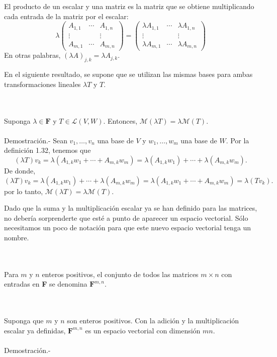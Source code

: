 \begin{mydef}\;\\\\
    El producto de un escalar y una matriz es la matriz que se obtiene multiplicando cada entrada de la matriz por el escalar:
    $$
    \lambda
	\begin{pmatrix}
	    A_{1,1}&\cdots&A_{1,n}\\
	    \vdots&&\vdots\\
	    A_{m,1}&\cdots&A_{m,n}
	\end{pmatrix}
	=
	\begin{pmatrix}
	    \lambda A_{1,1}&\cdots&\lambda A_{1,n}\\
	    \vdots&&\vdots\\
	    \lambda A_{m,1}&\cdots&\lambda A_{m,n}
	\end{pmatrix}
    $$
    En otras palabras, $(\lambda A)_{j,k}=\lambda A_{j,k}$.
\end{mydef}

En el siguiente resultado, se supone que se utilizan las mismas bases para ambas transformaciones lineales $\lambda T$ y $T$.

\begin{myteo}\;\\\\
    Suponga $\lambda \in \textbf{F}$ y $T\in \mathcal{L}(V,W)$. Entonces, $\mathcal{M}(\lambda T)=\lambda \mathcal{M}(T)$.\\\\
	Demostración.-\; Sean $v_1,\ldots, v_n$ una base de $V$ y $w_1,\ldots,w_m$ una base de $W$. Por la definición 1.32, tenemos que
	$$(\lambda T)v_k=\lambda\left(A_{1,k}w_1+\cdots +A_{m,k}w_m\right)=\lambda(A_{1,k}w_1)+\cdots +\lambda(A_{m,k}w_m).$$
	De donde, 
	$$(\lambda T)v_k=\lambda(A_{1,k}w_1)+\cdots +\lambda(A_{m,k}w_m)=\lambda(A_{1,k}w_1+\cdots +A_{m,k}w_m)=\lambda(Tv_k).$$
	por lo tanto, $\mathcal{M}(\lambda T)=\lambda \mathcal{M}(T)$.
\end{myteo}

Dado que la suma y la multiplicación escalar ya se han definido para las matrices, no debería sorprenderte que esté a punto de aparecer un espacio vectorial. Sólo necesitamos un poco de notación para que este nuevo espacio vectorial tenga un nombre.

\begin{mydef}\;\\\\
    Para $m$ y $n$ enteros positivos, el conjunto de todos las matrices $m\times n$ con entradas en \textbf{F} se denomina $\textbf{F}^{m,n}$.
\end{mydef}

\begin{myteo}[\boldmath $\textbf{F}^{m,n}=mn$]\,\\\\
    Suponga que $m$ y $n$ son enteros positivos. Con la adición y la multiplicación escalar ya definidas, $\textbf{F}^{m,n}$ es un espacio vectorial con dimensión $mn$.\\\\
	Demostración.-\;
\end{myteo}
